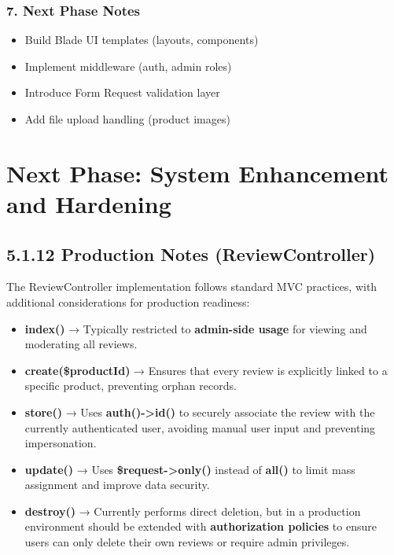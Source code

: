 \documentclass[12pt,a4paper]{article}
\begin{document}
\subsubsection{7. Next Phase Notes}

\begin{itemize}[noitemsep]
    \item Build Blade UI templates (layouts, components)
    \item Implement middleware (auth, admin roles)
    \item Introduce Form Request validation layer
    \item Add file upload handling (product images)
\end{itemize}

\section{Next Phase: System Enhancement and Hardening}

\subsection{5.1.12 Production Notes (ReviewController)}

The ReviewController implementation follows standard MVC practices, with additional considerations for production readiness:

\begin{itemize}[noitemsep]
    \item \textbf{index()} → Typically restricted to \textbf{admin-side usage} for viewing and moderating all reviews.
    
    \item \textbf{create(\$productId)} → Ensures that every review is explicitly linked to a specific product, preventing orphan records.
    
    \item \textbf{store()} → Uses \textbf{auth()->id()} to securely associate the review with the currently authenticated user, avoiding manual user input and preventing impersonation.
    
    \item \textbf{update()} → Uses \textbf{\$request->only()} instead of \textbf{all()} to limit mass assignment and improve data security.
    
    \item \textbf{destroy()} → Currently performs direct deletion, but in a production environment should be extended with \textbf{authorization policies} to ensure users can only delete their own reviews or require admin privileges.
\end{itemize}
\end{document}
